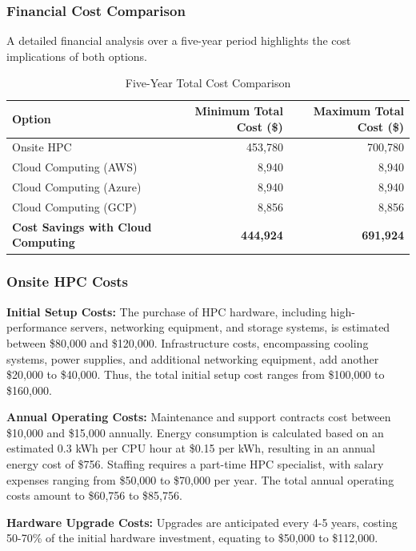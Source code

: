 \documentclass{article}
\begin{document}
\subsubsection{Financial Cost Comparison}
A detailed financial analysis over a five-year period highlights the cost implications of both options.

\begin{table}[H]
    \centering
    \caption{Five-Year Total Cost Comparison}
    \label{tab:total_cost_comparison}
    \begin{tabular}{lrr}
    \toprule
    \textbf{Option} & \textbf{Minimum Total Cost (\$)} & \textbf{Maximum Total Cost (\$)} \\
    \midrule
    Onsite HPC & 453,780 & 700,780 \\
    Cloud Computing (AWS) & 8,940 & 8,940 \\
    Cloud Computing (Azure) & 8,940 & 8,940 \\
    Cloud Computing (GCP) & 8,856 & 8,856 \\
    \midrule
    \textbf{Cost Savings with Cloud Computing} & \textbf{444,924} & \textbf{691,924} \\
    \bottomrule
    \end{tabular}
    \end{table}


\subsubsection{Onsite HPC Costs}
\textbf{Initial Setup Costs:}
The purchase of HPC hardware, including high-performance servers, networking equipment, and storage systems, is estimated between \$80,000 and \$120,000. Infrastructure costs, encompassing cooling systems, power supplies, and additional networking equipment, add another \$20,000 to \$40,000. Thus, the total initial setup cost ranges from \$100,000 to \$160,000.

\textbf{Annual Operating Costs:}
Maintenance and support contracts cost between \$10,000 and \$15,000 annually. Energy consumption is calculated based on an estimated 0.3 kWh per CPU hour at \$0.15 per kWh, resulting in an annual energy cost of \$756. Staffing requires a part-time HPC specialist, with salary expenses ranging from \$50,000 to \$70,000 per year. The total annual operating costs amount to \$60,756 to \$85,756.

\textbf{Hardware Upgrade Costs:}
Upgrades are anticipated every 4-5 years, costing 50-70\% of the initial hardware investment, equating to \$50,000 to \$112,000.
\end{document}
